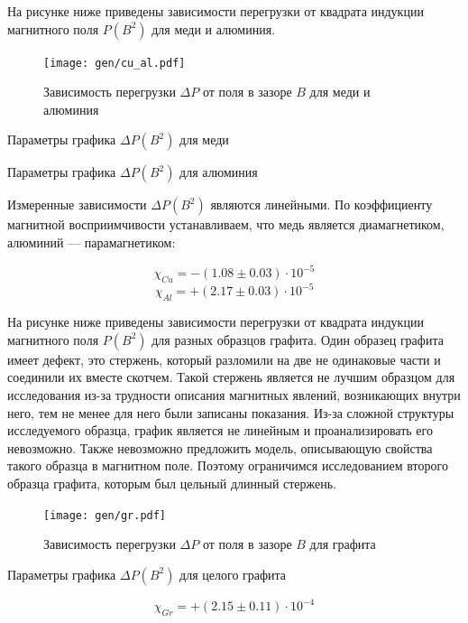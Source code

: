 \documentclass[12pt,a4paper]{article}
\begin{document}
	На рисунке ниже приведены зависимости перегрузки от квадрата индукции магнитного поля $P(B^2)$ для меди и алюминия.
	
	\begin{figure}[H]
		\texttt{[image: gen/cu\_al.pdf]}
		\caption{Зависимость перегрузки $\Delta P$ от поля в зазоре $B$ для меди и алюминия}
	\end{figure}

	\begin{table}[h]
		\caption{Параметры графика $\Delta P(B^2)$ для меди}
		
	\end{table}
	
	\begin{table}[h]
		\caption{Параметры графика $\Delta P(B^2)$ для алюминия}
		
	\end{table}
	
	Измеренные зависимости $\Delta P (B^2)$ являются линейными. По коэффициенту магнитной восприимчивости устанавливаем, что медь является диамагнетиком, алюминий --- парамагнетиком:
	
	$$\chi_{Cu} = -(1.08 \pm 0.03) \cdot 10^{-5} $$
	$$\chi_{Al} = +(2.17 \pm 0.03) \cdot 10^{-5} $$
	
	На рисунке ниже приведены зависимости перегрузки от квадрата индукции магнитного поля $P(B^2)$ для разных образцов графита. Один образец графита имеет дефект, это стержень, который разломили на две не одинаковые части и соединили их вместе скотчем. Такой стержень является не лучшим образцом для исследования из-за трудности описания магнитных явлений, возникающих внутри него, тем не менее для него были записаны показания. Из-за сложной структуры исследуемого образца, график является не линейным и проанализировать его невозможно. Также невозможно предложить модель, описывающую свойства такого образца в магнитном поле. Поэтому ограничимся исследованием второго образца графита, которым был цельный длинный стержень.
	
	\begin{figure}[H]
		\texttt{[image: gen/gr.pdf]}
		\caption{Зависимость перегрузки $\Delta P$ от поля в зазоре $B$ для графита}
	\end{figure}
	
	\begin{table}[h]
		\caption{Параметры графика $\Delta P(B^2)$ для целого графита}
		
	\end{table}
	
	$$\chi_{Gr} = +(2.15 \pm 0.11) \cdot 10^{-4} $$
	
\end{document}
